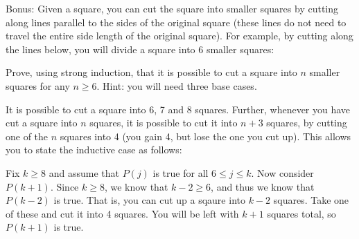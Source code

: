 \documentclass[10pt]{exam}
\begin{document}
\begin{questions}




  \bonusquestion[5] Bonus: Given a square, you can cut the square into smaller squares by cutting along lines parallel to the sides of the original square (these lines do not need to travel the entire side length of the original square).  For example, by cutting along the lines below, you will divide a square into 6 smaller squares:
  \begin{center}
  \end{center}
  Prove, using strong induction, that it is possible to cut a square into $n$ smaller squares for any $n \ge 6$.  Hint: you will need three base cases.

  \begin{solution}
    It is possible to cut a square into 6, 7 and 8 squares.  Further, whenever you have cut a square into $n$ squares, it is possible to cut it into $n+3$ squares, by cutting one of the $n$ squares into 4 (you gain 4, but lose the one you cut up).  This allows you to state the inductive case as follows:
    
    Fix $k \ge 8$ and assume that $P(j)$ is true for all $6 \le j \le k$.  Now consider $P(k+1)$.  Since $k \ge 8$, we know that $k-2 \ge 6$, and thus we know that $P(k-2)$ is true.  That is, you can cut up a sqaure into $k-2$ squares.  Take one of these and cut it into 4 squares.  You will be left with $k+1$ squares total, so $P(k+1)$ is true.
  \end{solution}

\end{questions}
\end{document}

